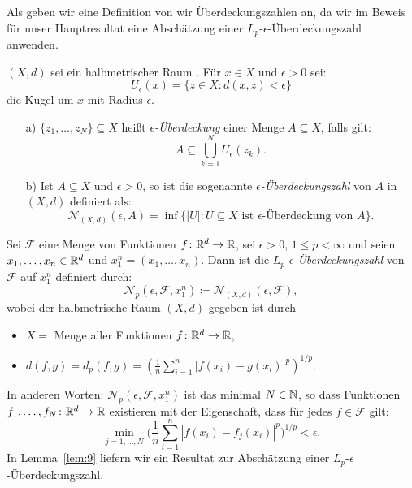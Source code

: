 Als geben wir eine Definition von wir Überdeckungszahlen an, da wir im Beweis für unser Hauptresultat eine Abschätzung einer $L_p\text{-}\epsilon$-Überdeckungszahl anwenden.
\begin{defn}
\label{ueberdeckung}
$(X, d)$ sei ein halbmetrischer Raum \cite{forster2016} . Für $x \in X$ und $\epsilon > 0$ sei:
$$U_{\epsilon}(x) = \{z \in X : d(x, z) < \epsilon\}$$
die Kugel um $x$ mit Radius $\epsilon$.
\begin{itemize}
\item[a)] $\{z_1,\dots,z_N\} \subseteq X$ heißt $\epsilon$\textit{-Überdeckung} einer Menge $A \subseteq X$, falls gilt:
$$A \subseteq \bigcup_{k = 1}^N U_{\epsilon}(z_k).$$
\item[b)] Ist $A \subseteq X$ und $\epsilon > 0$, so ist die sogenannte $\epsilon$\textit{-Überdeckungszahl} von $A$ in $(X,d)$ definiert als:
$$\mathcal{N}_{(X,d)}(\epsilon, A) = \inf\big\{|U| : U \subseteq X \text{ ist } \epsilon\text{-Überdeckung von } A\big\}.$$   
\end{itemize}
\end{defn} 
\begin{defn}
\label{lpe}
Sei $\mathcal{F}$ eine Menge von Funktionen $f\colon \mathbb{R}^d \to \mathbb{R}$, sei $\epsilon > 0$, $1 \leq p < \infty$ und seien $x_1,\dots,x_n \in \mathbb{R}^d$ und $x_1^n = (x_1,\dots,x_n).$ Dann ist die $L_p$-$\epsilon$\textit{-Überdeckungszahl} von $\mathcal{F}$ auf $x_1^n$ definiert durch:
$$\mathcal{N}_p(\epsilon, \mathcal{F}, x_1^n) \coloneqq \mathcal{N}_{(X,d)}(\epsilon, \mathcal{F}),$$
wobei der halbmetrische Raum $(X, d)$ gegeben ist durch
\begin{itemize}
\item $X = $ Menge aller Funktionen $f\colon \mathbb{R}^d \to \mathbb{R}$,
\item $d(f, g) = d_p(f, g) = (\frac{1}{n}\sum_{i = 1}^n |f(x_i) - g(x_i)|^p)^{1/p} .$
\end{itemize}
\end{defn}
In anderen Worten: $\mathcal{N}_p(\epsilon, \mathcal{F}, x_1^n)$ ist das minimal $N \in \mathbb{N}$, so dass Funktionen $f_1,\dots,f_N\colon \mathbb{R}^d \to \mathbb{R}$ existieren mit der Eigenschaft, dass für jedes $f \in \mathcal{F}$ gilt:
$$\min_{j = 1,\dots,N}\bigg(\frac{1}{n}\sum_{i = 1}^n|f(x_i) - f_j(x_i)|^p\bigg)^{1/p} < \epsilon.$$
In Lemma~\ref{lem:9} liefern wir ein Resultat zur Abschätzung einer $L_p$-$\epsilon$-Überdeckungszahl.


